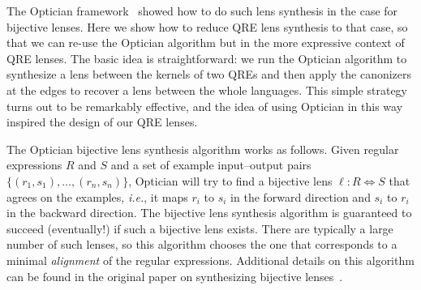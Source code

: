 \documentclass[acmsmall,screen]{acmart}
\begin{document}
The Optician framework~\cite{miltner2017synthesizing} showed how to do such lens synthesis in
the case for bijective lenses. Here we show how to reduce QRE lens synthesis to
that case, so that we can re-use the Optician algorithm but in the more
expressive context of QRE lenses.  The basic idea is straightforward: we run the
Optician algorithm to synthesize a lens between the kernels of two QREs and then
apply the canonizers at the edges to recover a lens between the whole
languages.  This simple strategy turns out to be remarkably effective, and the
idea of using Optician in this way inspired the design of our QRE lenses.  

The Optician bijective lens synthesis algorithm works as follows. Given regular
expressions $R$ and $S$ and a set of example input--output pairs $\{(r_1,
s_1),\allowbreak \ldots,\allowbreak (r_n, s_n)\}$, Optician will try to find a
bijective lens $\ell : R \Leftrightarrow S$ that agrees on the examples,
\textit{i.e.}, it maps $r_i$ to $s_i$ in the forward direction and $s_i$ to
$r_i$ in the backward direction. The bijective lens synthesis algorithm is
guaranteed to succeed (eventually!) if such a bijective lens exists. There are
typically a large number of such lenses, so this algorithm chooses the one that
corresponds to a minimal \emph{alignment} of the regular expressions. Additional
details on this algorithm can be found in the original paper on synthesizing
bijective lenses~\cite{miltner2017synthesizing}.
\end{document}
